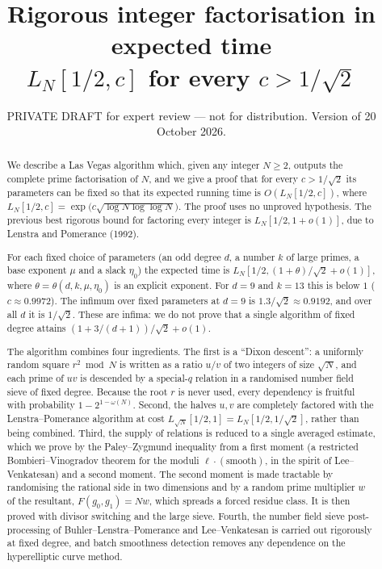 \documentclass[11pt]{amsart}
\title[{Factoring in expected time $L_N[1/2,c]$, $c<1$}]{Rigorous integer factorisation in expected time\\
$L_N[1/2,c]$ for every $c>1/\sqrt2$}
\author{}
\date{PRIVATE DRAFT for expert review --- not for distribution. Version of 20 October 2026.}
\theoremstyle{definition}
\begin{document}
\begin{abstract}
We describe a Las Vegas algorithm which, given any integer $N\ge2$, outputs the complete prime
factorisation of $N$, and we give a proof that for every $c>1/\sqrt2$ its parameters can be fixed so
that its expected running time is $O(L_N[1/2,c])$, where $L_N[1/2,c]=\exp\bigl(c\sqrt{\log N\log\log
N}\bigr)$. The proof uses no unproved hypothesis. The previous best rigorous bound for factoring every integer is
$L_N[1/2,1+o(1)]$, due to Lenstra and Pomerance (1992).

For each fixed choice of parameters (an odd degree $d$, a number $k$ of large primes, a base exponent
$\mu$ and a slack $\eta_0$) the expected time is $L_N[1/2,(1+\theta)/\sqrt2+o(1)]$, where $\theta=\theta(d,k,\mu,\eta_0)$
is an explicit exponent. For $d=9$ and $k=13$ this is below $1$ ($c\approx0.9972$). The infimum over
fixed parameters at $d=9$ is $1.3/\sqrt2\approx0.9192$, and over all $d$ it is $1/\sqrt2$. These are
infima: we do not prove that a single algorithm of fixed degree attains $(1+3/(d+1))/\sqrt2+o(1)$.

The algorithm combines four ingredients. The first is a ``Dixon descent'': a uniformly random square
$r^2\bmod N$ is written as a ratio $u/v$ of two integers of size $\sqrt N$, and each prime of $uv$ is
descended by a special-$q$ relation in a randomised number field sieve of fixed degree. Because the
root $r$ is never used, every dependency is fruitful with probability $1-2^{1-\omega(N)}$. Second,
the halves $u,v$ are completely factored with the Lenstra--Pomerance algorithm at cost $L_{\sqrt
N}[1/2,1]=L_N[1/2,1/\sqrt2]$, rather than being combined. Third, the supply of relations is reduced
to a single averaged estimate, which we prove by the Paley--Zygmund inequality from a first moment (a
restricted Bombieri--Vinogradov theorem for the moduli $\ell\cdot(\text{smooth})$, in the spirit of Lee--Venkatesan) and a second moment. The
second moment is made tractable by randomising the rational side in two dimensions and by a random
prime multiplier $w$ of the resultant, $F(g_0,g_1)=Nw$, which spreads a forced residue class.
It is then proved with divisor switching and the large sieve. Fourth, the number field sieve
post-processing of Buhler--Lenstra--Pomerance and Lee--Venkatesan is carried out rigorously at fixed
degree, and batch smoothness detection removes any dependence on the hyperelliptic curve method.


\end{abstract}
\end{document}
